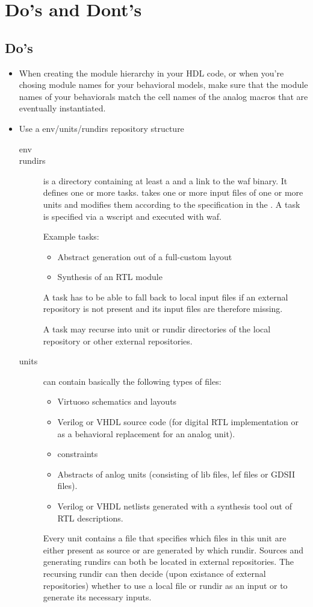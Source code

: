\chapter{Do's and Dont's}
\section{Do's}
\begin{itemize}
    \item When creating the module hierarchy in your HDL code, or when you're chosing module names for your behavioral models, make sure that the module names of your behaviorals match the cell names of the analog macros that are eventually instantiated.
    \item Use a env/units/rundirs repository structure
 \begin{description}
    \item[env]
	\item[rundirs]
		is a directory containing at least a  and a link to the waf binary. It defines one or more tasks.
		takes one or more input files of one or more units and modifies them
		according to the specification in the .
		A task is specified via a wscript and executed with waf.

		Example tasks:
		\begin{itemize}
			\item Abstract generation out of a full-custom layout 
			\item Synthesis of an RTL module
		\end{itemize}

		A task has to be able to fall back to local input files if an external repository is not present and its input files are therefore missing.

		A task may recurse into unit or rundir directories of the local repository or other external repositories.

	\item[units]
		can contain basically the following types of files:
		\begin{itemize}
			\item Virtuoso schematics and layouts
			\item Verilog or VHDL source code (for digital RTL implementation or as a behavioral replacement for an analog unit).
			\item constraints
			\item Abstracts of anlog units (consisting of lib files, lef files or GDSII files).
			\item Verilog or VHDL netlists generated with a synthesis tool out of RTL descriptions.
		\end{itemize}

		Every unit contains a file that specifies which files in this unit are either present as source or are generated by which rundir.
		Sources and generating rundirs can both be located in external repositories.
		The recursing rundir can then decide (upon existance of external repositories) whether to use a local file or rundir as an input or to generate its necessary inputs.
\end{description}
\end{itemize}
